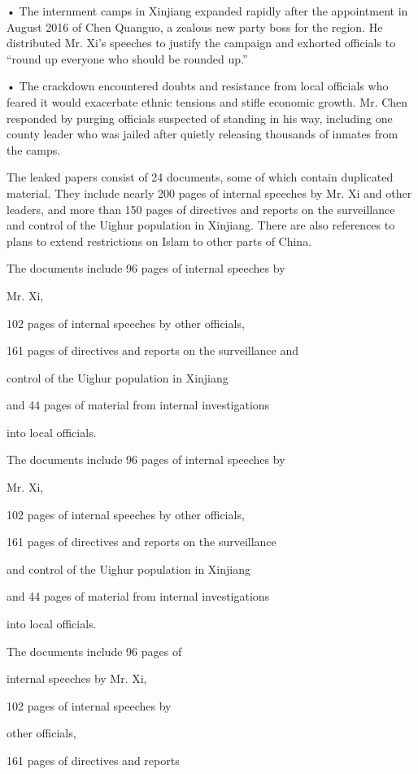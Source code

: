 • The internment camps in Xinjiang expanded rapidly after the
appointment in August 2016 of Chen Quanguo, a zealous new party boss for
the region. He distributed Mr. Xi's speeches to justify the campaign and
exhorted officials to ``round up everyone who should be rounded up.''

• The crackdown encountered doubts and resistance from local officials
who feared it would exacerbate ethnic tensions and stifle economic
growth. Mr. Chen responded by purging officials suspected of standing in
his way, including one county leader who was jailed after quietly
releasing thousands of inmates from the camps.

The leaked papers consist of 24 documents, some of which contain
duplicated material. They include nearly 200 pages of internal speeches
by Mr. Xi and other leaders, and more than 150 pages of directives and
reports on the surveillance and control of the Uighur population in
Xinjiang. There are also references to plans to extend restrictions on
Islam to other parts of China.

The documents include 96 pages of internal speeches by

Mr. Xi,

102 pages of internal speeches by other officials,

161 pages of directives and reports on the surveillance and

control of the Uighur population in Xinjiang

and 44 pages of material from internal investigations

into local officials.

The documents include 96 pages of internal speeches by

Mr. Xi,

102 pages of internal speeches by other officials,

161 pages of directives and reports on the surveillance

and control of the Uighur population in Xinjiang

and 44 pages of material from internal investigations

into local officials.

The documents include 96 pages of

internal speeches by Mr. Xi,

102 pages of internal speeches by

other officials,

161 pages of directives and reports

